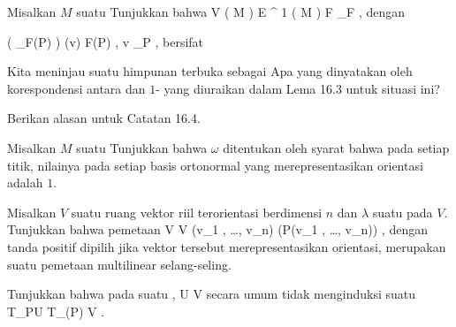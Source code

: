 {}
{

Misalkan $M$ suatu
Tunjukkan bahwa
\maabbeledisp {} {
{ \mathcal V } ( M )  } {
{ \mathcal E }^{  1 } (  M   )
} { F } { \omega_F
} {,}
dengan

\mavergleichskettedisp
{\vergleichskette
{ \left(  \omega_F(P)  \right) (v)
}
{ } { \left\langle F(P) , v  \right\rangle_P
}
{ } {
}
{ } {
}
{ } {
}
}
{}{}{,}
bersifat

}
{} {}

{}
{

Kita meninjau suatu himpunan terbuka
 sebagai
 Apa yang dinyatakan oleh korespondensi antara
dan
$1$-
yang diuraikan dalam
Lema 16.3
untuk situasi ini?

}
{} {}

{}
{

Berikan alasan untuk
Catatan 16.4.

}
{} {}

{}
{

Misalkan $M$ suatu
 Tunjukkan bahwa
 $\omega$ ditentukan oleh syarat bahwa pada setiap titik, nilainya pada setiap basis ortonormal yang merepresentasikan orientasi adalah $1$.

}
{} {}

{}
{

Misalkan $V$ suatu ruang vektor riil terorientasi berdimensi $n$ dan $\lambda$ suatu
pada $V$. Tunjukkan bahwa pemetaan
\maabbeledisp {} {V \times \cdots \times V} {\R
} {(v_1 , \ldots , v_n) } { \pm \lambda (P(v_1 , \ldots , v_n))
} {,}
dengan tanda positif dipilih jika vektor tersebut merepresentasikan orientasi, merupakan suatu pemetaan multilinear selang-seling.

}
{} {}

{}
{

Tunjukkan bahwa pada suatu
,
\maabbdisp {\alpha} { U } { V
} {}
secara umum tidak menginduksi suatu
 {T_PU} {T_{\alpha(P)} V
} {}
 {} {.}

}
{} {}

